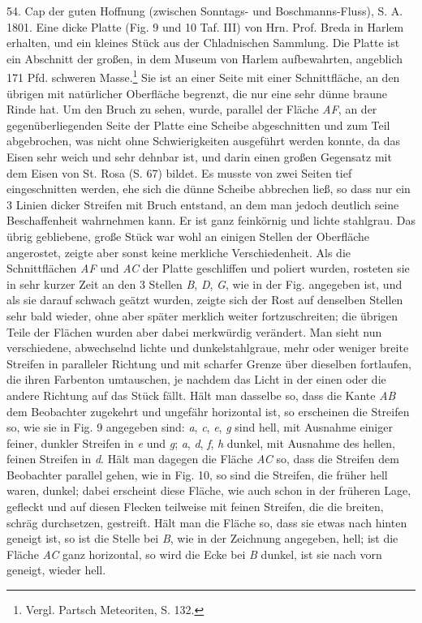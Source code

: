 \documentclass[a4paper, 11pt, oneside]{article}
\begin{document}
54. Cap der guten Hoffnung (zwischen Sonntags- und Boschmanns-Fluss), S. A. 1801. Eine dicke Platte (Fig. 9 und 10 Taf. III) von Hrn. Prof. Breda in Harlem erhalten, und ein kleines Stück aus der Chladnischen Sammlung. Die Platte ist ein Abschnitt der großen, in dem Museum von Harlem aufbewahrten, angeblich 171 Pfd. schweren Masse.\footnote{Vergl. Partsch Meteoriten, S. 132.} Sie ist an einer Seite mit einer Schnittfläche, an den übrigen mit natürlicher Oberfläche begrenzt, die nur eine sehr dünne braune Rinde hat. Um den Bruch zu sehen, wurde, parallel der Fläche \emph{AF}, an der gegenüberliegenden Seite der Platte eine Scheibe abgeschnitten und zum Teil abgebrochen, was nicht ohne Schwierigkeiten ausgeführt werden konnte, da das Eisen sehr weich und sehr dehnbar ist, und darin einen großen Gegensatz mit dem Eisen von St. Rosa (S. 67) bildet. Es musste von zwei Seiten tief eingeschnitten werden, ehe sich die dünne Scheibe abbrechen ließ, so dass nur ein 3 Linien dicker Streifen mit Bruch entstand, an dem man jedoch deutlich seine Beschaffenheit wahrnehmen kann. Er ist ganz feinkörnig und lichte stahlgrau. Das übrig gebliebene, große Stück war wohl an einigen Stellen der Oberfläche angerostet, zeigte aber sonst keine merkliche Verschiedenheit. Als die Schnittflächen \emph{AF} und \emph{AC} der Platte geschliffen und poliert wurden, rosteten sie in sehr kurzer Zeit an den 3 Stellen \emph{B}, \emph{D}, \emph{G}, wie in der Fig. angegeben ist, und als sie darauf schwach geätzt wurden, zeigte sich der Rost auf denselben Stellen sehr bald wieder, ohne aber später merklich weiter fortzuschreiten; die übrigen Teile der Flächen wurden aber dabei merkwürdig verändert. Man sieht nun verschiedene, abwechselnd lichte und dunkelstahlgraue, mehr oder weniger breite Streifen in paralleler Richtung und mit scharfer Grenze über dieselben fortlaufen, die ihren Farbenton umtauschen, je nachdem das Licht in der einen oder die andere Richtung auf das Stück fällt. Hält man dasselbe so, dass die Kante \emph{AB} dem Beobachter zugekehrt und ungefähr horizontal ist, so erscheinen die Streifen so, wie sie in Fig. 9 angegeben sind: \emph{a}, \emph{c}, \emph{e}, \emph{g} sind hell, mit Ausnahme einiger feiner, dunkler Streifen in \emph{e} und \emph{g}; \emph{a}, \emph{d}, \emph{f}, \emph{h} dunkel, mit Ausnahme des hellen, feinen Streifen in \emph{d}. Hält man dagegen die Fläche \emph{AC} so, dass die Streifen dem Beobachter parallel gehen, wie in Fig. 10, so sind die Streifen, die früher hell waren, dunkel; dabei erscheint diese Fläche, wie auch schon in der früheren Lage, gefleckt und auf diesen Flecken teilweise mit feinen Streifen, die die breiten, schräg durchsetzen, gestreift. Hält man die Fläche so, dass sie etwas nach hinten geneigt ist, so ist die Stelle bei \emph{B}, wie in der Zeichnung angegeben, hell; ist die Fläche \emph{AC} ganz horizontal, so wird die Ecke bei \emph{B} dunkel, ist sie nach vorn geneigt, wieder hell.
\end{document}
